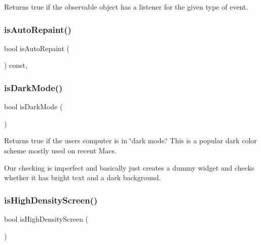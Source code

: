 Returns true if the observable object has a listener for the given type of event. 

\mbox{\label{classsgl_1_1GForwardDrawingSurface_a189881032e2b355095790b83b2454d8d}} 
\subsubsection{\texorpdfstring{is\+Auto\+Repaint()}{isAutoRepaint()}}
{\footnotesize\ttfamily bool is\+Auto\+Repaint (\begin{DoxyParamCaption}{ }\end{DoxyParamCaption}) const\hspace{0.3cm}{\ttfamily [override]}, {\ttfamily [inherited]}}

\mbox{\label{classsgl_1_1GWindow_a36044a6efa9c4e015378e56c3e37181d}} 
\subsubsection{\texorpdfstring{is\+Dark\+Mode()}{isDarkMode()}}
{\footnotesize\ttfamily bool is\+Dark\+Mode (\begin{DoxyParamCaption}{ }\end{DoxyParamCaption})\hspace{0.3cm}{\ttfamily [static]}}



Returns true if the user\textquotesingle{}s computer is in \char`\"{}dark mode.\char`\"{} This is a popular dark color scheme mostly used on recent Macs. 

Our checking is imperfect and basically just creates a dummy widget and checks whether it has bright text and a dark background. \mbox{\label{classsgl_1_1GWindow_a674ef3ad6e66d778e410e130cad47274}} 
\subsubsection{\texorpdfstring{is\+High\+Density\+Screen()}{isHighDensityScreen()}}
{\footnotesize\ttfamily bool is\+High\+Density\+Screen (\begin{DoxyParamCaption}{ }\end{DoxyParamCaption})\hspace{0.3cm}{\ttfamily [static]}}



